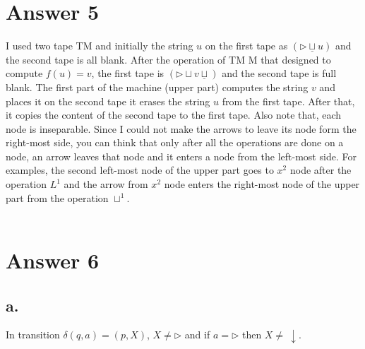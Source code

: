 \documentclass[12pt]{article}
\begin{document}
\section*{Answer 5}
I used two tape TM and initially the string $u$ on the first tape as $(\triangleright \underline{\sqcup} u)$ and the second tape is all blank. After the operation of TM M that designed to compute $f(u)=v$, the first tape is $(\triangleright \sqcup v \underline{\sqcup})$ and the second tape is full blank. The first part of the machine (upper part) computes the string $v$ and places it on the second tape it erases the string $u$ from the first tape. After that, it copies the content of the second tape to the first tape. Also note that, each node is inseparable. Since I could not make the arrows to leave its node form the right-most side, you can think that only after all the operations are done on a node, an arrow leaves that node and it enters a node from the left-most side. For examples, the second left-most node of the upper part goes to $x^2$ node after the operation $L^1$ and the arrow from $x^2$ node enters the right-most node of the upper part from the operation $\sqcup^1$. \\ \\

\section*{Answer 6}
\subsection*{a.}
In transition $\delta(q,a) = (p,X)$, $X\neq \triangleright$ and if $a=\triangleright$ then $X\neq \ \downarrow$.
\end{document}
